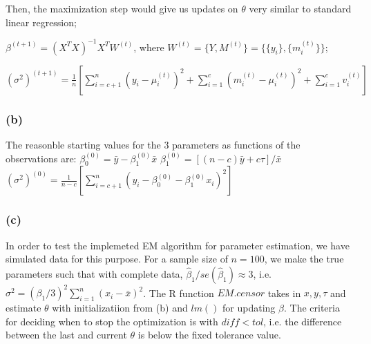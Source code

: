 \documentclass{article}\usepackage{graphicx, color}
\begin{document}
Then, the maximization step would give us updates on $\theta$ very similar to standard linear regression;\newline

$\beta^{(t+1)} = (X^TX)^{-1}X^TW^{(t)}$, where $W^{(t)}=\{Y, M^{(t)}\}=\{\{y_i\},\{m_i^{(t)}\}\}$; \newline

$\displaystyle (\sigma^2)^{(t+1)} =
\frac{1}{n}[\sum_{i=c+1}^n(y_i-\mu_i^{(t)})^2 + \sum_{i=1}^c(m_i^{(t)}-\mu_i^{(t)})^2 + \sum_{i=1}^cv_i^{(t)}]$

\subsubsection*{(b)}
\hspace{12 pt} The reasonble starting values for the 3 parameters as functions of the observations are:\newline
$\displaystyle \beta_0^{(0)} = \bar y - \beta_1^{(0)}\bar x$\newline
$\displaystyle \beta_1^{(0)} = [(n-c)\bar y + c\tau]/{\bar x}$\newline
$\displaystyle (\sigma^2)^{(0)} = \frac{1}{n-c}[\sum_{i=c+1}^n(y_i-\beta_0^{(0)}-\beta_1^{(0)}x_i)^2]$\newline

\subsubsection*{(c)}
\hspace{12 pt} In order to test the implemeted EM algorithm for parameter estimation, we have simulated data for this purpose. For a sample size of $n=100$,
we make the true parameters such that with complete data, $\hat\beta_1/se(\hat\beta_1)\approx3$, 
i.e. $\sigma^2 = (\beta_1/3)^2\sum_{i=1}^n(x_i-\bar x)^2$. The R function $EM.censor$ takes in $x,y,\tau$ and estimate $\theta$ with initializatiion
from (b) and $lm()$ for updating $\beta$. The criteria for deciding when to stop the optimization is with $diff < tol$, i.e. the difference between
the last and current $\theta$ is below the fixed tolerance value.
\end{document}
